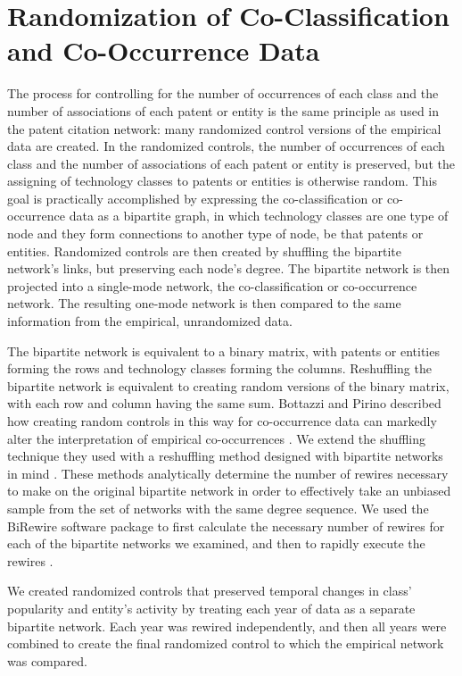 \documentclass[pre,reprint,groupedaddress,superscriptaddress]{revtex4-1}
\begin{document}
\section{Randomization of Co-Classification and Co-Occurrence Data}
 The process for controlling for the number of occurrences of each class and the number of associations of each patent or entity is the same principle as used in the patent citation network: many randomized control versions of the empirical data are created.  In the randomized controls, the number of occurrences of each class and the number of associations of each patent or entity is preserved, but the assigning of technology classes to patents or entities is otherwise random. This goal is practically accomplished by expressing the co-classification or co-occurrence data as a bipartite graph, in which technology classes are one type of node and they form connections to another type of node, be that patents or entities. Randomized controls are then created by shuffling the bipartite network's links, but preserving each node's degree. The bipartite network is then projected into a single-mode network, the co-classification or co-occurrence network. The resulting one-mode network is then compared to the same information from the empirical, unrandomized data.

The bipartite network is  equivalent to a binary matrix, with patents or entities forming the rows and technology classes forming the columns. Reshuffling the bipartite network is equivalent to creating random versions of the binary matrix, with each row and column having the same sum. Bottazzi and Pirino described how creating random controls in this way for co-occurrence data can markedly alter the interpretation of empirical co-occurrences \cite{Bottazzi2010}. We extend the shuffling technique they used with a reshuffling method designed with bipartite networks in mind \cite{Gobbi2014}. These methods analytically determine the number of rewires necessary to make on the original bipartite network in order to effectively take an unbiased sample from the set of networks with the same degree sequence. We used the BiRewire software package to first calculate the necessary number of rewires for each of the bipartite networks we examined, and then to rapidly execute the rewires \cite{Gobbi2015}.

We created randomized controls that preserved temporal changes in class' popularity and entity's activity by treating each year of data as a separate bipartite network. Each year was rewired independently, and then all years were combined to create the final randomized control to which the empirical network was compared.
\end{document}
